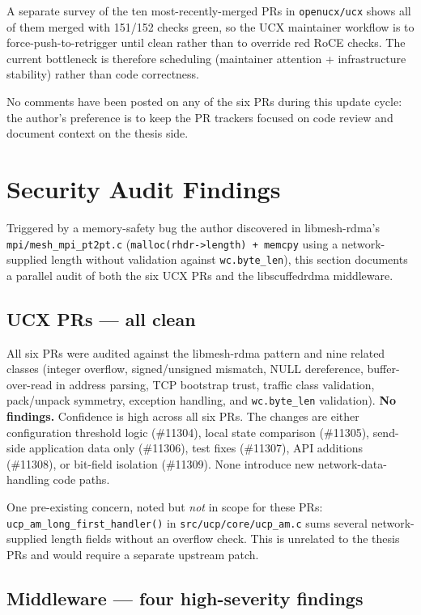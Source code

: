 \documentclass[11pt]{article}
\begin{document}
A separate survey of the ten most-recently-merged PRs in
\texttt{openucx/ucx} shows all of them merged with 151/152 checks
green, so the UCX maintainer workflow is to force-push-to-retrigger
until clean rather than to override red RoCE checks. The current
bottleneck is therefore scheduling (maintainer attention +
infrastructure stability) rather than code correctness.

No comments have been posted on any of the six PRs during this update
cycle: the author's preference is to keep the PR trackers focused on
code review and document context on the thesis side.

\section{Security Audit Findings}

Triggered by a memory-safety bug the author discovered in
libmesh-rdma's \texttt{mpi/mesh\_mpi\_pt2pt.c}
(\texttt{malloc(rhdr->length) + memcpy} using a network-supplied length
without validation against \texttt{wc.byte\_len}), this section
documents a parallel audit of both the six UCX PRs and the
libscuffedrdma middleware.

\subsection{UCX PRs --- all clean}

All six PRs were audited against the libmesh-rdma pattern and nine
related classes (integer overflow, signed/unsigned mismatch, NULL
dereference, buffer-over-read in address parsing, TCP bootstrap trust,
traffic class validation, pack/unpack symmetry, exception handling,
and \texttt{wc.byte\_len} validation). \textbf{No findings.} Confidence
is high across all six PRs. The changes are either configuration
threshold logic (\#11304), local state comparison (\#11305), send-side
application data only (\#11306), test fixes (\#11307), API additions
(\#11308), or bit-field isolation (\#11309). None introduce new
network-data-handling code paths.

One pre-existing concern, noted but \emph{not} in scope for these PRs:
\texttt{ucp\_am\_long\_first\_handler()} in
\texttt{src/ucp/core/ucp\_am.c} sums several network-supplied length
fields without an overflow check. This is unrelated to the thesis
PRs and would require a separate upstream patch.

\subsection{Middleware --- four high-severity findings}
\end{document}
